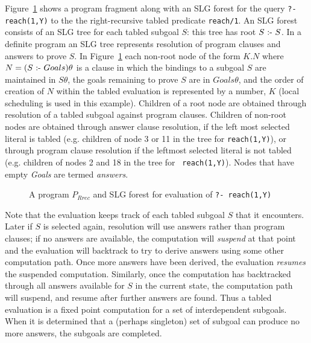 \begin{example} \rm 
Figure~\ref{fig:local} shows a program fragment along with an SLG
forest for the query {\tt ?- reach(1,Y)} to the the right-recursive
tabled predicate {\tt reach/1}.  An SLG forest consists of an SLG tree
for each tabled subgoal $S$: this tree has root $S \mbox{ :- }{} S$.  In a
definite program an SLG tree represents resolution of program clauses
and answers to prove $S$.  In Figure~\ref{fig:local} each non-root
node of the form $K. N$ where $N = (S \mbox{ :- }{} Goals)\theta$ is a clause
in which the bindings to a subgoal $S$ are maintained in $S\theta$,
the goals remaining to prove $S$ are in $Goals\theta$, and the order
of creation of $N$ within the tabled evaluation is represented by a
number, $K$ (local scheduling is used in this example).  Children of a
root node are obtained through resolution of a tabled subgoal against
program clauses.  Children of non-root nodes are obtained through
answer clause resolution, if the left most selected literal is tabled
(e.g. children of node 3 or 11 in the tree for {\tt reach(1,Y)}), or
through program clause resolution if the leftmost selected literal is
not tabled (e.g. children of nodes 2 and 18 in the tree for {\tt
  reach(1,Y)}).  Nodes that have empty {\em Goals} are termed {\em
  answers}.
%
\begin{figure}[htbp]
\centering
\mbox{
{}}
\caption{A program $P_{Rrec}$ and SLG forest for evaluation of {\tt ?- reach(1,Y)}} \label{fig:local}
\end{figure}
%
Note that the evaluation keeps track of each tabled subgoal $S$ that
it encounters.  Later if $S$ is selected again, resolution will use
answers rather than program clauses; if no answers are available, the
computation will {\em suspend} at that point and the evaluation will
backtrack to try to derive answers using some other computation path.
Once more answers have been derived, the evaluation {\em resumes} the
suspended computation.  Similarly, once the computation has
backtracked through all answers available for $S$ in the current
state, the computation path will suspend, and resume after further
answers are found.  Thus a tabled evaluation is a fixed point
computation for a set of interdependent subgoals.  When it is
determined that a (perhaps singleton) set of subgoal can produce no
more answers, the subgoals are completed.
\end{example}


